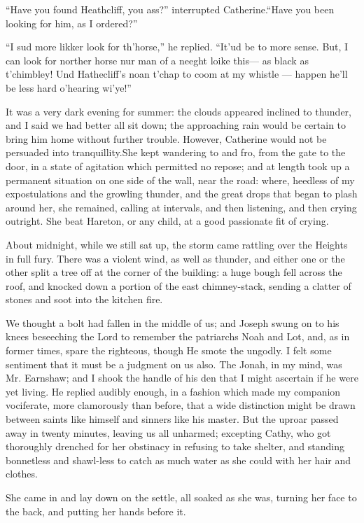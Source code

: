 \par “Have you found Heathcliff, you ass?” interrupted Catherine.“Have you been looking for him, as I ordered?”
\par “I sud more likker look for th'horse,” he replied. “It'ud be to more sense. But, I can look for norther horse nur man of a neeght loike this— as black as t'chimbley! Und Hathecliff's noan t'chap to coom at my whistle — happen he'll be less hard o'hearing wi'ye!”
\par It was a very dark evening for summer: the clouds appeared inclined to thunder, and I said we had better all sit down; the approaching rain would be certain to bring him home without further trouble. However, Catherine would not be persuaded into tranquillity.She kept wandering to and fro, from the gate to the door, in a state of agitation which permitted no repose; and at length took up a permanent situation on one side of the wall, near the road: where, heedless of my expostulations and the growling thunder, and the great drops that began to plash around her, she remained, calling at intervals, and then listening, and then crying outright. She beat Hareton, or any child, at a good passionate fit of crying.
\par About midnight, while we still sat up, the storm came rattling over the Heights in full fury. There was a violent wind, as well as thunder, and either one or the other split a tree off at the corner of the building: a huge bough fell across the roof, and knocked down a portion of the east chimney-stack, sending a clatter of stones and soot into the kitchen fire.
\par We thought a bolt had fallen in the middle of us; and Joseph swung on to his knees beseeching the Lord to remember the patriarchs Noah and Lot, and, as in former times, spare the righteous, though He smote the ungodly. I felt some sentiment that it must be a judgment on us also. The Jonah, in my mind, was Mr. Earnshaw; and I shook the handle of his den that I might ascertain if he were yet living. He replied audibly enough, in a fashion which made my companion vociferate, more clamorously than before, that a wide distinction might be drawn between saints like himself and sinners like his master. But the uproar passed away in twenty minutes, leaving us all unharmed; excepting Cathy, who got thoroughly drenched for her obstinacy in refusing to take shelter, and standing bonnetless and shawl-less to catch as much water as she could with her hair and clothes.
\par She came in and lay down on the settle, all soaked as she was, turning her face to the back, and putting her hands before it.
